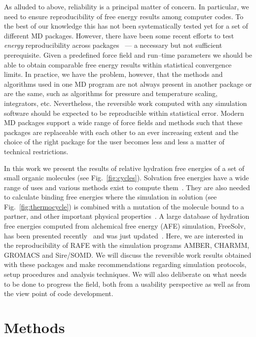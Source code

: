 \documentclass[journal=jctcce,manuscript=article]{achemso}
\begin{document}
As alluded to above, reliability is a principal matter of concern.  In
particular, we need to ensure reproducibility of free energy results
among computer codes.  To the best of our knowledge this has not been
systematically tested yet for a set of different MD packages. 
However, there have been some recent efforts to test \emph{energy} 
reproducibility across packages~\cite{Shirts2017} --- a necessary but not 
sufficient prerequisite.  Given a
predefined force field and run--time parameters we should be able to
obtain comparable free energy results within statistical convergence
limits.  In practice, we have the problem, however, that the methods
and algorithms used in one MD program are not always present in another
package or are the same, such as algorithms for pressure and temperature scaling,
integrators, etc.  Nevertheless, the reversible work computed with any
simulation software should be expected to be reproducible within statistical error.  Modern MD
packages support a wide range of force fields and methods such that
these packages are replaceable with each other to an ever increasing
extent and the choice of the right package for the user becomes less
and less a matter of technical restrictions.

In this work we present the results of relative hydration free
energies of a set of small organic molecules (see
Fig.~\ref{fig:cycles}).  Solvation free energies have a wide range of
uses and various methods exist to compute
them~\cite{Skyner:2015:PCCP}.  They are also needed to calculate
binding free energies where the simulation in solution (see
Fig.~\ref{fig:thermocycle}) is combined with a mutation of the
molecule bound to a partner, and other important physical
properties~\cite{Skyner:2015:PCCP}.  A large database of hydration
free energies computed from alchemical free energy (AFE) simulation, FreeSolv, 
has been presented recently~\cite{Mobley2014} and was just 
updated~\cite{doi:10.1021/acs.jced.7b00104}.  Here, we are interested 
in the reproducibility of RAFE with the simulation programs AMBER, CHARMM,
GROMACS and Sire/SOMD.  We will discuss the reversible work results
obtained with these packages and make recommendations
regarding simulation protocols, setup procedures and analysis
techniques.  We will also deliberate on what needs to be done to progress the 
field, both from a usability perspective as well as from the view point of code 
development.


\section{Methods}
\label{sec:methods}
\end{document}

